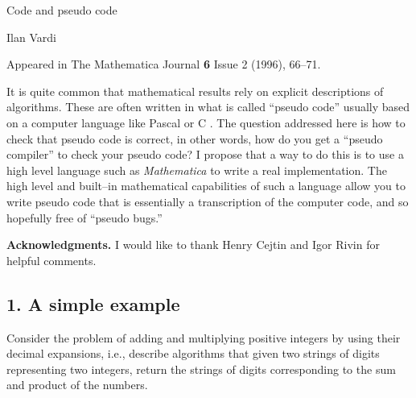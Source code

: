 \newlength{\boxedparwidth}
 \setlength{\boxedparwidth}{.92 \textwidth}

\newenvironment{boxedtext}
{\begin{center}
 \begin{tabular}{|@{\hspace{.15 in}}c@{\hspace{.15 in}}|}
  \hline \\ \begin{minipage}[t]{\boxedparwidth}
    \setlength{\parindent}{.25 in}}
    {\end{minipage} \\ \\ \hline \end{tabular} \end{center}}
\def\calc{{\cal C}}


\begin{center}
{\LARGE Code and pseudo code}


\medskip
{\Large Ilan Vardi}

\medskip
Appeared in The Mathematica Journal {\bf 6} Issue 2 (1996), 66--71.

\end{center}






\bigskip
It is quite common that mathematical results rely on explicit
descriptions of algorithms. These are often written in what is called
``pseudo code'' usually based on a computer language like Pascal or C
\cite{Gonnet} \cite{Sedgewick} \cite{SedgewickC}.  
The question addressed here is
how to check that pseudo code is correct, in other words, how do you
get a ``pseudo compiler'' to check your pseudo code? I propose that a
way to do this is to use a high level language such as {\sl
Mathematica\/} to write a real implementation. The high level and
built--in mathematical capabilities of such a language allow you to
write pseudo code that is essentially a transcription of the computer
code, and so hopefully free of ``pseudo bugs.''

\medskip\noindent
{\bf Acknowledgments.} I would like to thank Henry Cejtin and Igor Rivin
for helpful comments. 

\subsection*{1. A simple example}

Consider the problem of adding and multiplying positive integers by
using their decimal expansions, i.e., describe algorithms that given
two strings of digits representing two integers, return the strings of
digits corresponding to the sum and product of the numbers.

